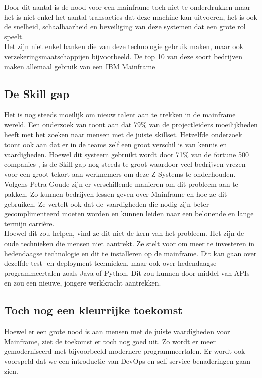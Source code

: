 Door dit aantal is de nood voor een mainframe toch niet te onderdrukken maar het is niet enkel het aantal transacties dat deze machine kan uitvoeren, het is ook de snelheid, schaalbaarheid en beveiliging van deze systemen dat een grote rol speelt. \\
Het zijn niet enkel banken die van deze technologie gebruik maken, maar ook  verzekeringsmaatschappijen bijvoorbeeld. De top 10 van deze soort bedrijven maken allemaal gebruik van een IBM Mainframe \autocite{Tozzi2022}

\subsection{De Skill gap}
Het is nog steeds moeilijk om nieuw talent aan te trekken in de mainframe wereld. Een onderzoek van \textcite{Deloitte2020} toont aan dat 79\% van de projectleiders moeilijkheden heeft met het zoeken naar mensen met de juiste skillset. Hetzelfde onderzoek toont ook aan dat er in de teams zelf een groot verschil is van kennis en vaardigheden. Hoewel dit systeem gebruikt wordt door 71\% van de fortune 500 companies \autocite{Tozzi2022} , is de Skill gap nog steeds te groot waardoor veel bedrijven vrezen voor een groot tekort aan werknemers om deze Z Systems te onderhouden. \\

Volgens Petra Goude zijn er verschillende manieren om dit probleem aan te pakken. Zo kunnen bedrijven lessen geven over Mainframe en hoe ze dit gebruiken. Ze vertelt ook dat de vaardigheden die nodig zijn beter gecomplimenteerd moeten worden en kunnen leiden naar een belonende en lange termijn carrière. \\ Hoewel dit zou helpen, vind ze dit niet de kern van het probleem. Het zijn de oude technieken die mensen niet aantrekt. Ze stelt voor om meer te investeren in hedendaagse technologie en dit te installeren op de mainframe. Dit kan gaan over dezelfde test -en deployment technieken, maar ook over hedendaagse programmeertalen zoals Java of Python. Dit zou kunnen door middel van APIs en zou een nieuwe, jongere werkkracht aantrekken. \autocite{Goude2023}


\subsection{Toch nog een kleurrijke toekomst}
Hoewel er een grote nood is aan mensen met de juiste vaardigheden voor Mainframe, ziet de toekomst er toch nog goed uit. Zo wordt er meer gemoderniseerd met bijvoorbeeld modernere programmeertalen. Er wordt ook voorspeld dat we een introductie van DevOps en self-service benaderingen gaan zien. \autocite{Pennaz2023} \\


